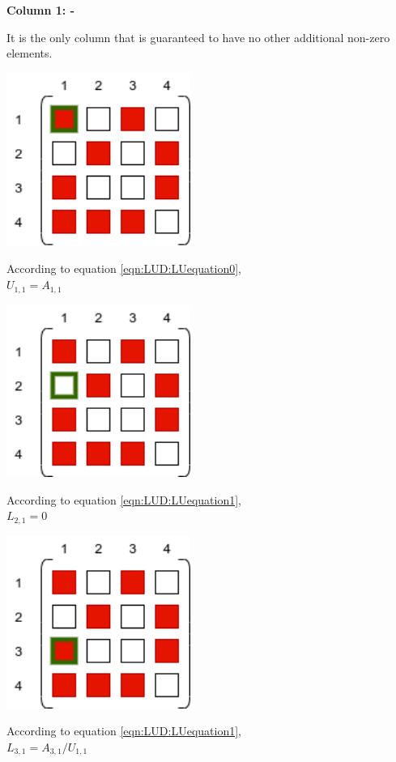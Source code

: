 
\textbf{Column 1: -}

It is the only column that is guaranteed to have no other additional non-zero elements.
\begin{minipage}{0.45\textwidth}
\includegraphics[width=0.45\textwidth]{./Scheduler/PpT-Symbolic_A00.png}
\end{minipage}%
\hfill
\begin{minipage}{0.85\textwidth}
According to equation \ref{eqn:LUD:LUequation0},\\
$U_{1,1}=A_{1,1}$
\end{minipage}

\begin{minipage}{0.45\textwidth}
\includegraphics[width=0.45\textwidth]{./Scheduler/PpT-Symbolic_A01.png}
\end{minipage}%
\hfill
\begin{minipage}{0.85\textwidth}
According to equation \ref{eqn:LUD:LUequation1},\\
$L_{2,1}=0$
\end{minipage}

\begin{minipage}{0.45\textwidth}
\includegraphics[width=0.45\textwidth]{./Scheduler/PpT-Symbolic_A02.png}
\end{minipage}%
\hfill
\begin{minipage}{0.85\textwidth}
According to equation \ref{eqn:LUD:LUequation1},\\
$L_{3,1}=A_{3,1}/U_{1,1}$
\end{minipage}

